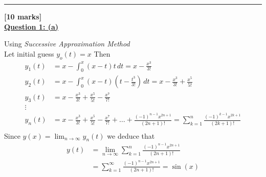 \documentclass[]{article}
\begin{document}
\hrule
\textbf{[10 marks]}\\
\textbf{\underline{Question 1: (a)}}
\begin{adjustwidth}{1cm}{2cm}
    Using \textit{Successive Approximation Method}\\
    Let initial guess $\displaystyle y_{o}(t) =x$ Then
    \begin{align*}
        y_1(t) & = x -\int_0^x (x-t)t \, dt = x-\frac{x^3}{3!}                                                                                                \\
        y_2(t) & = x -\int_0^x (x-t)(t-\frac{t^3}{3!})\, dt = x-\frac{x^3}{3!}+\frac{x^5}{5!}                                                                 \\
        y_3(t) & = x-\frac{x^3}{3!}+\frac{x^5}{5!}-\frac{x^7}{7!}                                                                                             \\
        \vdots &                                                                                                                                              \\
        y_n(t) & =x-\frac{x^3}{3!}+\frac{x^5}{5!}-\frac{x^7}{7!}+\dots+ \frac{(-1)^{n-1}x^{2n+1}}{(2n+1)!} = \sum_{k=1}^{n}\frac{(-1)^{k-1}x^{2k+1}}{(2k+1)!} \\
    \end{align*}
    Since $\displaystyle y(x) = \lim_{n \to \infty} y_n(t)$ we deduce that
    \begin{align*}
        y(t) & =\lim_{n \to \infty}\sum_{k=1}^{n} \frac{(-1)^{n-1}x^{2n+1}}{(2n+1)!} \\
             & =\sum_{k=1}^{\infty} \frac{(-1)^{n-1}x^{2n+1}}{(2n+1)!} = \sin(x)
    \end{align*}
\end{adjustwidth}
\end{document}
